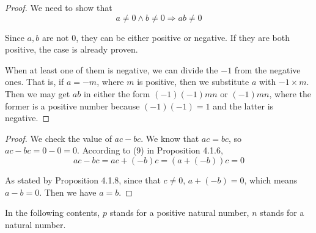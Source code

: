 \begin{proof}
We need to show that 
\[
a \neq 0 \wedge b \neq 0 \Longrightarrow ab \neq 0
\]

Since $a,b$ are not 0, they can be either positive or negative. If they are both positive, the case is 
already proven.

When at least one of them is negative, we can divide the $-1$ from the negative ones. That is, if $a=-m$, 
where $m$ is positive, then we substitute $a$ with $-1 \times m$. Then we may get $ab$ in either the form 
$(-1)(-1) mn$ or $(-1) mn$, where the former is a positive number because $(-1)(-1) =1$ and the latter is 
negative.
\end{proof}

\begin{proof}
We check the value of $ac-bc$. We know that $ac=bc$, so $ac - bc = 0 - 0 = 0$. According to (9) in 
Proposition 4.1.6, 
\[
ac - bc = ac+(-b)c = (a+(-b))c = 0
\]

As stated by Proposition 4.1.8, since that $c \neq 0$, $a+(-b) = 0$, which means $a-b=0$. Then we have 
$a=b$.
\end{proof}

In the following contents, $p$ stands for a positive natural number, $n$ stands for a natural number.

